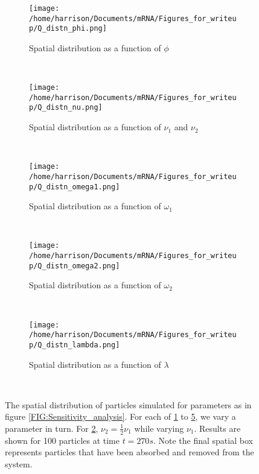 \documentclass[twocolumn]{biophys}
\begin{document}
\begin{figure}
        \centering
        \begin{subfigure}[h]{0.95\columnwidth}
                \texttt{[image: /home/harrison/Documents/mRNA/Figures\_for\_writeup/Q\_distn\_phi.png]}
                \caption{Spatial distribution as a function of $\phi$}
                \label{fig:phi}
        \end{subfigure}%
        
        
        ~ %
        \begin{subfigure}[h]{0.95\columnwidth}
                \texttt{[image: /home/harrison/Documents/mRNA/Figures\_for\_writeup/Q\_distn\_nu.png]}
                \caption{Spatial distribution as a function of $\nu_1$ and $\nu_2$}
                \label{fig:nu1}
        \end{subfigure}
         
         ~
         
         \begin{subfigure}[h]{0.95\columnwidth}
                \texttt{[image: /home/harrison/Documents/mRNA/Figures\_for\_writeup/Q\_distn\_omega1.png]}
                \caption{Spatial distribution as a function of $\omega_1$}
                \label{fig:omega1}
        \end{subfigure}%
        
        ~ 
   
    \begin{subfigure}[h]{0.95\columnwidth}
                \texttt{[image: /home/harrison/Documents/mRNA/Figures\_for\_writeup/Q\_distn\_omega2.png]}
                \caption{Spatial distribution as a function of $\omega_2$}
                \label{fig:omega2}
        \end{subfigure}%
        
        
        ~ 
        
         \begin{subfigure}[h]{0.95\columnwidth}
                \texttt{[image: /home/harrison/Documents/mRNA/Figures\_for\_writeup/Q\_distn\_lambda.png]}
                \caption{Spatial distribution as a function of $\lambda$}
                \label{fig:lambda}
        \end{subfigure}%
        
        
        ~ 
        \caption{The spatial distribution of particles simulated for parameters as in figure \ref{FIG:Sensitivity_analysis}. For each of \ref{fig:phi} to \ref{fig:lambda}, we vary a parameter in turn. 
        For \ref{fig:nu1}, $\nu_2=\frac{1}{2}\nu_1$ while varying $\nu_1$. Results are shown for 100 particles at time $t=270s$. Note the final spatial box represents particles that have been absorbed and removed from the system.}
        \label{FIG:Sensitivity_of_Q}
\end{figure}
\end{document}
